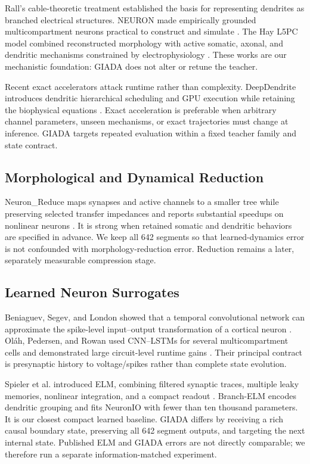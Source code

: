 \documentclass[11pt]{article}
\begin{document}
Rall's cable-theoretic treatment established the basis for representing
dendrites as branched electrical structures. NEURON made empirically grounded
multicompartment neurons practical to construct and simulate
\cite{hines1997}. The Hay L5PC model combined reconstructed morphology with
active somatic, axonal, and dendritic mechanisms constrained by
electrophysiology \cite{hay2011}. These works are our mechanistic foundation:
GIADA does not alter or retune the teacher.

Recent exact accelerators attack runtime rather than complexity. DeepDendrite
introduces dendritic hierarchical scheduling and GPU execution while retaining
the biophysical equations \cite{zhang2023}. Exact acceleration is preferable
when arbitrary channel parameters, unseen mechanisms, or exact trajectories
must change at inference. GIADA targets repeated evaluation within a fixed
teacher family and state contract.

\subsection{Morphological and Dynamical Reduction}

Neuron\_Reduce maps synapses and active channels to a smaller tree while
preserving selected transfer impedances and reports substantial speedups on
nonlinear neurons \cite{amsalem2020}. It is strong when retained somatic and
dendritic behaviors are specified in advance. We keep all 642 segments so that
learned-dynamics error is not confounded with morphology-reduction error.
Reduction remains a later, separately measurable compression stage.

\subsection{Learned Neuron Surrogates}

Beniaguev, Segev, and London showed that a temporal convolutional network can
approximate the spike-level input--output transformation of a cortical neuron
\cite{beniaguev2021}. Ol\'ah, Pedersen, and Rowan used CNN--LSTMs for several
multicompartment cells and demonstrated large circuit-level runtime gains
\cite{olah2022}. Their principal contract is presynaptic history to
voltage/spikes rather than complete state evolution.

Spieler et al. introduced ELM, combining filtered synaptic traces, multiple
leaky memories, nonlinear integration, and a compact readout
\cite{spieler2024}. Branch-ELM encodes dendritic grouping and fits NeuronIO with
fewer than ten thousand parameters. It is our closest compact learned baseline.
GIADA differs by receiving a rich causal boundary state, preserving all 642
segment outputs, and targeting the next internal state. Published ELM and
GIADA errors are not directly comparable; we therefore run a separate
information-matched experiment.
\end{document}
